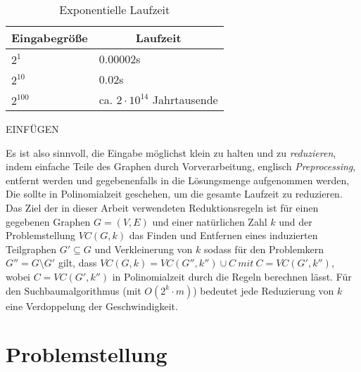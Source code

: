  \begin{table}[htb]
\caption{Exponentielle Laufzeit \label{tab:exponential}}
\vspace*{1em}
\centering

\bgroup
\def\arraystretch{1.3}%

\begin{threeparttable}

\begin{tabular}[c]{ l | l }
	
	\multicolumn{1}{c|}{\textbf{Eingabegröße}} & 
	\multicolumn{1}{c}{\textbf{Laufzeit}} \\ 
	
	\hline

	$2^{1}$& 0.00002s\\
	$2^{10}$& 0.02s\\
	$2^{100}$& ca. $ 2 \cdot 10^{14} $ Jahrtausende \\
	
\end{tabular}

\begin{tablenotes}\footnotesize
\item EINFÜGEN
\end{tablenotes}

\end{threeparttable}

\egroup

\end{table}
Es ist also sinnvoll, die Eingabe möglichst klein zu halten und zu \emph{reduzieren}, indem einfache Teile des Graphen durch Vorverarbeitung, englisch \emph{Preprocessing}, entfernt werden und gegebenenfalls in die Lösungsmenge aufgenommen werden, Die sollte in Polinomialzeit geschehen, um die gesamte Laufzeit zu reduzieren. Das Ziel der in dieser Arbeit verwendeten Reduktionsregeln ist für einen gegebenen Graphen $G=(V,E)$ und einer natürlichen Zahl $k$ und der Problemstellung $VC(G,k)$ das Finden und Entfernen eines induzierten Teilgraphen $G' \subseteq G$ und Verkleinerung von $k$
sodass für den Problemkern $G'' = G \setminus G'$ gilt, dass $VC(G,k) = VC(G'',k'') \cup C\ mit\ C=VC(G', k'')$, wobei $C=VC(G', k'')$ in Polinomialzeit durch die Regeln berechnen lässt. Für den Suchbaumalgorithmus (mit $O(2^{k} \cdot m)$) bedeutet jede Reduzierung von $k$ eine Verdoppelung der Geschwindigkeit. 


\section{Problemstellung}
\label{ch:Einleitung:sec:Problemstellung}

